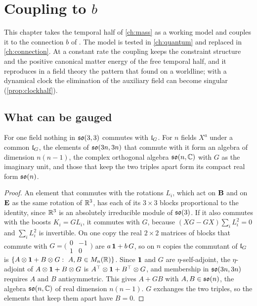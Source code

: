 \chapter{Coupling to \texorpdfstring{$b$}{b}}
\label{ch:bcoupling}

This chapter takes the temporal half of \cref{ch:mass} as a working model and couples it to the connection $b$ of . The model
is tested in \cref{ch:quantum} and replaced in \cref{ch:connection}. At a constant rate the coupling keeps the constraint structure and the
positive canonical matter energy of the free temporal half, and it reproduces in a field theory the pattern that  found on a
worldline; with a dynamical clock the elimination of the auxiliary field can become singular (\cref{prop:clockhalf}).

\section{What can be gauged}

\begin{proposition}
\label{prop:copy}
For one field nothing in $\mathfrak{so}(3,3)$ commutes with $\mathfrak l_G$. For $n$ fields $X^a$ under a common $\mathfrak l_G$, the elements of $\mathfrak{so}(3n,3n)$ that
commute with it form an algebra of dimension $n(n-1)$, the complex orthogonal algebra $\mathfrak{so}(n,\mathbb{C})$ with $G$ as the imaginary
unit, and those that keep the two triples apart form its compact real form $\mathfrak{so}(n)$.
\end{proposition}

\begin{proof}
An element that commutes with the rotations $L_i$, which act on $\mathbf B$ and on $\mathbf E$ as the same rotation of $\mathbb{R}^3$, has each of its
$3\times3$ blocks proportional to the identity, since $\mathbb{R}^3$ is an absolutely irreducible module of $\mathfrak{so}(3)$. If it also commutes with the
boosts $K_i=GL_i$, it commutes with $G$, because $(XG-GX)\sum_iL_i^2=0$ and $\sum_iL_i^2$ is invertible. On one copy the real $2\times2$
matrices of blocks that commute with $G=\bigl(\begin{smallmatrix}0&-1\\1&0\end{smallmatrix}\bigr)$ are $a\,\mathbf 1+b\,G$, so on $n$ copies the
commutant of $\mathfrak l_G$ is $\{A\otimes\mathbf 1+B\otimes G:\ A,B\in M_n(\mathbb{R})\}$. Since $\mathbf 1$ and $G$ are $\eta$-self-adjoint, the $\eta$-adjoint of
$A\otimes\mathbf 1+B\otimes G$ is $A^\top\otimes\mathbf 1+B^\top\otimes G$, and membership in $\mathfrak{so}(3n,3n)$ requires $A$ and $B$ antisymmetric. This
gives $A+GB$ with $A,B\in\mathfrak{so}(n)$, the algebra $\mathfrak{so}(n,\mathbb{C})$ of real dimension $n(n-1)$. $G$ exchanges the two triples, so the
elements that keep them apart have $B=0$.
\end{proof}

